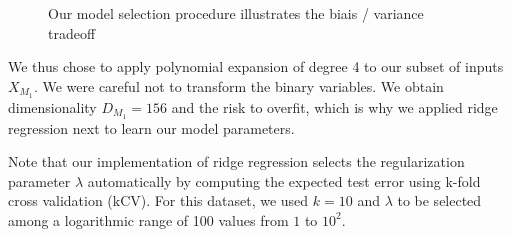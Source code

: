 \documentclass{article} %
\begin{document}
  \begin{figure}[h]
    \center
    \hfill
    \caption{Our model selection procedure illustrates the biais / variance tradeoff}
    \label{fig:basisExpansionTestError}
  \end{figure}

  We thus chose to apply polynomial expansion of degree 4 to our subset of inputs $X_{M_1}$. We were careful not to transform the binary variables. We obtain dimensionality $D_{M_1} = 156$ and the risk to overfit, which is why we applied ridge regression next to learn our model parameters.

  Note that our implementation of ridge regression selects the regularization parameter $\lambda$ automatically by computing the expected test error using k-fold cross validation (kCV). For this dataset, we used $k = 10$ and $\lambda$ to be selected among a logarithmic range of 100 values from $1$ to $10^2$.
\end{document}
